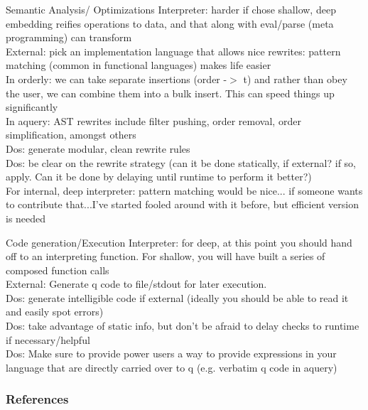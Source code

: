 \documentclass{beamer}
\begin{document}
\begin{frame}{Semantic Analysis/ Optimizations}
Interpreter: harder if chose shallow, deep embedding reifies operations to data, and that along with 
eval/parse (meta programming) can transform \\
External: pick an implementation language that allows nice rewrites: pattern matching (common in functional languages) makes life easier \\

In orderly: we can take separate insertions (order -$>$ t) and rather than obey the user, we can combine them into a
bulk insert. This can speed things up significantly \\

In aquery: AST rewrites include filter pushing, order removal, order simplification, amongst others \\

Dos: generate modular, clean rewrite rules \\
Dos: be clear on the rewrite strategy (can it be done statically, if external? if so, apply.  Can it be done by delaying until runtime to perform it better?) \\

For internal, deep interpreter: pattern matching would be nice... if someone wants to contribute that...I've started fooled around with it before, but efficient version is needed \\
\end{frame}

\begin{frame}{Code generation/Execution}
Interpreter: for deep, at this point you should hand off to an interpreting function. For shallow, you will have built a 
series of composed function calls \\

External: Generate q code to file/stdout for later execution. \\

Dos: generate intelligible code if external (ideally you should be able to read it and easily spot errors) \\
Dos: take advantage of static info, but don't be afraid to delay checks to runtime if necessary/helpful \\
Dos: Make sure to provide power users a way to provide expressions in your language that are directly carried
over to q (e.g. verbatim q code in aquery) \\
\end{frame}




\begin{frame}[allowframebreaks]
        \frametitle{References}
        
        
\end{frame}
\end{document}
